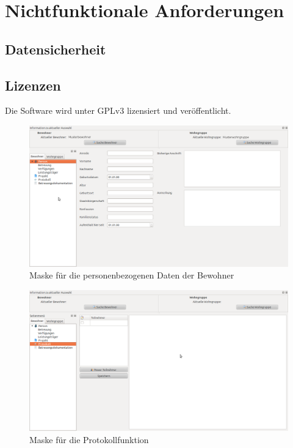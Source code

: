 \documentclass[a4paper,10pt]{article}
\begin{document}
\section{Nichtfunktionale Anforderungen}
\subsection{Datensicherheit}
\subsection{Lizenzen}
Die Software wird unter GPLv3 lizensiert und veröffentlicht.

\begin{figure}
\includegraphics[angle=90, width=\textwidth, height=\textheight]{BewohnerInfo}
\caption{Maske für die personenbezogenen Daten der Bewohner}
\label{Info}
\end{figure}
\begin{figure}
 \includegraphics[angle=90, width=\textwidth, height=\textheight]{BewohnerProtokoll}
\caption{Maske für die Protokollfunktion}
\label{Protokoll}
\end{figure}
\end{document}
